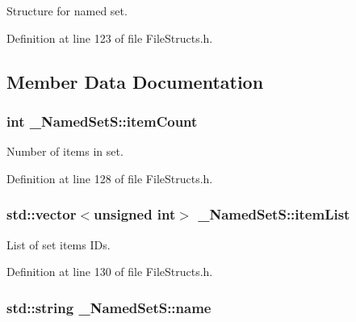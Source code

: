 Structure for named set. 

Definition at line 123 of file File\+Structs.\+h.



\subsection{Member Data Documentation}
\subsubsection[{\texorpdfstring{item\+Count}{itemCount}}]{\setlength{\rightskip}{0pt plus 5cm}int \+\_\+\+Named\+Set\+S\+::item\+Count}\hypertarget{struct___named_set_s_a2453a0c4e55b896ee5aca2df8ad95ee1}{}\label{struct___named_set_s_a2453a0c4e55b896ee5aca2df8ad95ee1}


Number of items in set. 



Definition at line 128 of file File\+Structs.\+h.

\subsubsection[{\texorpdfstring{item\+List}{itemList}}]{\setlength{\rightskip}{0pt plus 5cm}std\+::vector$<$unsigned int$>$ \+\_\+\+Named\+Set\+S\+::item\+List}\hypertarget{struct___named_set_s_abc51fae38f5fbec8cd241f03bc753016}{}\label{struct___named_set_s_abc51fae38f5fbec8cd241f03bc753016}


List of set items I\+Ds. 



Definition at line 130 of file File\+Structs.\+h.

\subsubsection[{\texorpdfstring{name}{name}}]{\setlength{\rightskip}{0pt plus 5cm}std\+::string \+\_\+\+Named\+Set\+S\+::name}\hypertarget{struct___named_set_s_a4490e74ce159285c8cf682c298627261}{}\label{struct___named_set_s_a4490e74ce159285c8cf682c298627261}


